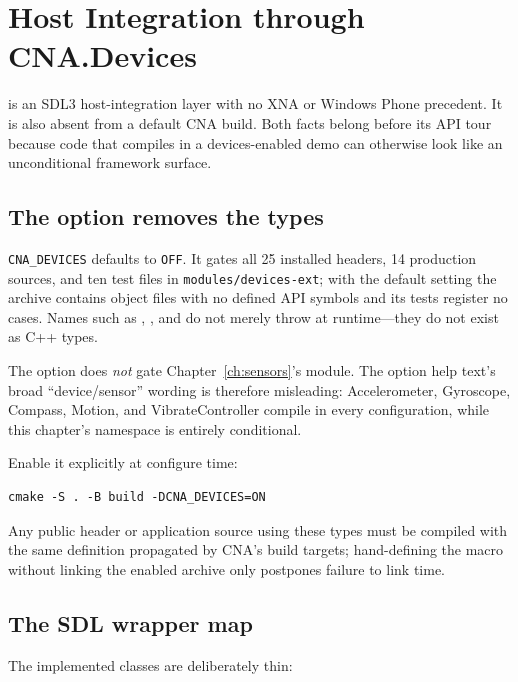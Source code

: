 \chapter{Host Integration through CNA.Devices}
\label{ch:host-devices}

 is an SDL3 host-integration layer with no XNA or Windows Phone precedent.
It is also absent from a default CNA build. Both facts belong before its API tour because code
that compiles in a devices-enabled demo can otherwise look like an unconditional framework
surface.

\section{The option removes the types}

\texttt{CNA\_DEVICES} defaults to \texttt{OFF}. It gates all 25 installed headers, 14 production
sources, and ten test files in \texttt{modules/devices-ext}; with the default setting the
archive contains object files with no defined API symbols and its tests register no cases.
Names such as , , and  do not merely
throw at runtime---they do not exist as C++ types.

The option does \emph{not} gate Chapter~\ref{ch:sensors}'s
 module. The option help text's broad ``device/sensor''
wording is therefore misleading: Accelerometer, Gyroscope, Compass, Motion, and
VibrateController compile in every configuration, while this chapter's namespace is entirely
conditional.

Enable it explicitly at configure time:

\begin{lstlisting}
cmake -S . -B build -DCNA_DEVICES=ON
\end{lstlisting}

Any public header or application source using these types must be compiled with the same
definition propagated by CNA's build targets; hand-defining the macro without linking the
enabled archive only postpones failure to link time.

\section{The SDL wrapper map}

The implemented classes are deliberately thin:

